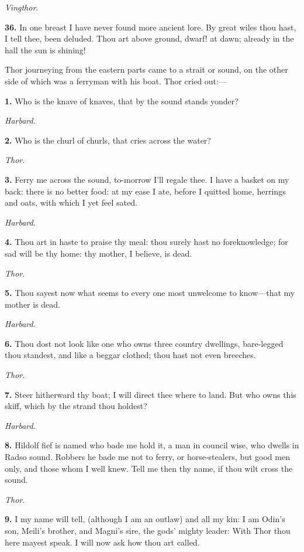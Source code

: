 \emph{Vingthor}.

\textbf{36.} In one breast I have never found more ancient lore. By great
wiles thou hast, I tell thee, been deluded. Thou art above ground,
dwarf! at dawn; already in the hall the sun is shining!


Thor journeying from the eastern parts came to a strait or sound, on
the other side of which was a ferryman with his boat. Thor cried
out:—

\textbf{1.} Who is the knave of knaves, that by the sound stands yonder?

\emph{Harbard}.

\textbf{2.} Who is the churl of churls, that cries across the water?

\emph{Thor}.

\textbf{3.} Ferry me across the sound, to-morrow I'll regale thee. I have a
basket on my back: there is no better food: at my ease I ate, before I
quitted home, herrings and oats, with which I yet feel sated.

\emph{Harbard}.

\textbf{4.} Thou art in haste to praise thy meal: thou surely hast no
foreknowledge; for sad will be thy home: thy mother, I believe, is
dead.

\emph{Thor}.

\textbf{5.} Thou sayest now what seems to every one most unwelcome to
know—that my mother is dead.

\emph{Harbard}.

\textbf{6.} Thou dost not look like one who owns three country dwellings,
bare-legged thou standest, and like a beggar clothed; thou hast not
even breeches.

\emph{Thor}.

\textbf{7.} Steer hitherward thy boat; I will direct thee where to land. But
who owns this skiff, which by the strand thou holdest?

\emph{Harbard}.

\textbf{8.} Hildolf fief is named who bade me hold it, a man in council wise,
who dwells in Radso sound. Robbers he bade me not to ferry, or
horse-stealers, but good men only, and those whom I well knew. Tell me
then thy name, if thou wilt cross the sound.

\emph{Thor}.

\textbf{9.} I my name will tell, (although I am an outlaw) and all my kin: I
am Odin's son, Meili's brother, and Magni's sire, the gods' mighty
leader: With Thor thou here mayest speak. I will now ask how thou art
called.

